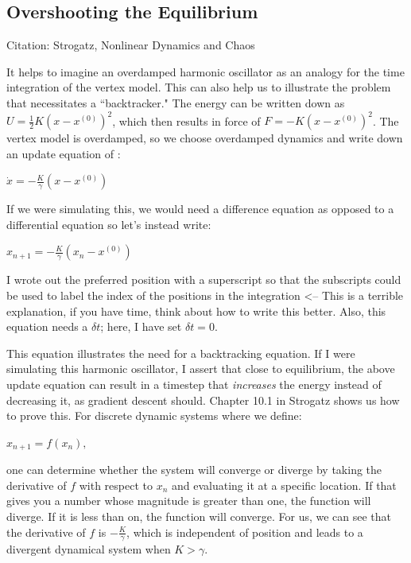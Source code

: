 \documentclass[12pt,a4paper]{article}
\begin{document}
\subsection{Overshooting the Equilibrium}

Citation: Strogatz, Nonlinear Dynamics and Chaos

It helps to imagine an overdamped harmonic oscillator as an analogy for the time integration of the vertex model. This can also help us to illustrate the problem that necessitates a ``backtracker." The energy can be written down as $U = \frac{1}{2}K(x-x^{(0)})^2$, which then results in force of $F = -K (x-x^{(0)})^2$. The vertex model is overdamped, so we choose overdamped dynamics and write down an update equation of :

\begin{center}
	\begin{math}
		\dot{x} = -\frac{K}{\gamma}(x-x^{(0)})
	\end{math}
\end{center}
If we were simulating this, we would need a difference equation as opposed to a differential equation so let's instead write:

\begin{center}
	\begin{math}
		x_{n+1} = -\frac{K}{\gamma} ( x_{n} - x^{(0)} )
	\end{math}
\end{center}
I wrote out the preferred position with a superscript so that the subscripts could be used to label the index of the positions in the integration <-- This is a terrible explanation, if you have time, think about how to write this better. Also, this equation needs a $\delta t$; here, I have set $\delta t = 0$. 

This equation illustrates the need for a backtracking equation. If I were simulating this harmonic oscillator, I assert that close to equilibrium, the above update equation can result in a timestep that \textit{increases} the energy instead of decreasing it, as gradient descent should. Chapter 10.1 in Strogatz shows us how to prove this. For discrete dynamic systems where we define:

\begin{center}
	\begin{math}
		x_{n+1} = f(x_n),
	\end{math}
\end{center}
one can determine whether the system will converge or diverge by taking the derivative of $f$ with respect to $x_n$ and evaluating it at a specific location. If that gives you a number whose magnitude is greater than one, the function will diverge. If it is less than on, the function will converge. For us, we can see that the derivative of $f$ is $-\frac{K}{\gamma}$, which is independent of position and leads to a divergent dynamical system when $K > \gamma$. 
\end{document}
